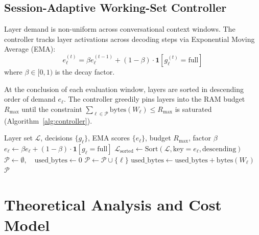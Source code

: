 \documentclass[11pt,a4paper]{article}
\begin{document}
\subsection{Session-Adaptive Working-Set Controller}
Layer demand is non-uniform across conversational context windows. The controller tracks layer activations across decoding steps via Exponential Moving Average (EMA):
\begin{equation}
    e_\ell^{(t)} = \beta e_\ell^{(t-1)} + (1 - \beta) \cdot \mathbf{1}[g_\ell^{(t)} = \text{full}]
\end{equation}
where $\beta \in [0, 1)$ is the decay factor. 

At the conclusion of each evaluation window, layers are sorted in descending order of demand $e_\ell$. The controller greedily pins layers into the RAM budget $R_{\max}$ until the constraint $\sum_{\ell \in \mathcal{P}} \text{bytes}(W_\ell) \le R_{\max}$ is saturated (Algorithm~\ref{alg:controller}).

\begin{algorithm}[t]
\caption{Session-Adaptive Working-Set Controller}
\label{alg:controller}
\begin{algorithmic}[1]
\Require Layer set $\mathcal{L}$, decisions $\{g_\ell\}$, EMA scores $\{e_\ell\}$, budget $R_{\max}$, factor $\beta$
    \State $e_\ell \gets \beta e_\ell + (1 - \beta) \cdot \mathbf{1}[g_\ell = \text{full}]$
\EndFor
\State $\mathcal{L}_{\text{sorted}} \gets \text{Sort}(\mathcal{L}, \text{key}=e_\ell, \text{descending})$
\State $\mathcal{P} \gets \emptyset, \quad \text{used\_bytes} \gets 0$
        \State $\mathcal{P} \gets \mathcal{P} \cup \{\ell\}$
        \State $\text{used\_bytes} \gets \text{used\_bytes} + \text{bytes}(W_\ell)$
    \EndIf
\EndFor
\State \Return $\mathcal{P}$
\end{algorithmic}
\end{algorithm}

\section{Theoretical Analysis and Cost Model}
\end{document}
